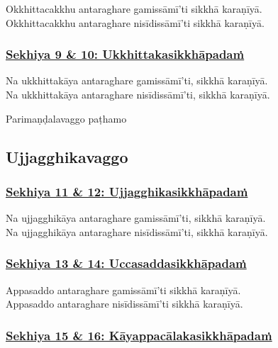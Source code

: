 Okkhittacakkhu antaraghare gamissāmī'ti sikkhā karaṇīyā.\\
Okkhittacakkhu antaraghare nisīdissāmī'ti sikkhā karaṇīyā.



\subsubsection*{\hyperref[training9-10]{Sekhiya 9 \& 10: Ukkhittakasikkhāpadaṁ}}
\label{sekh9-10}

Na ukkhittakāya antaraghare gamissāmī'ti, sikkhā karaṇīyā.\\
Na ukkhittakāya antaraghare nisīdissāmī'ti, sikkhā karaṇīyā.

\begin{center}
	Parimaṇḍalavaggo paṭhamo
\end{center}



\subsection{Ujjagghikavaggo}

\subsubsection*{\hyperref[training11-12]{Sekhiya 11 \& 12: Ujjagghikasikkhāpadaṁ}}
\label{sekh11-12}

Na ujjagghikāya antaraghare gamissāmī'ti, sikkhā karaṇīyā.\\
Na ujjagghikāya antaraghare nisīdissāmī'ti, sikkhā karaṇīyā.



\subsubsection*{\hyperref[training13-14]{Sekhiya 13 \& 14: Uccasaddasikkhāpadaṁ}}
\label{sekh13-14}

Appasaddo antaraghare gamissāmī'ti sikkhā karaṇīyā.\\
Appasaddo antaraghare nisīdissāmī'ti sikkhā karaṇīyā.



\subsubsection*{\hyperref[training15-16]{Sekhiya 15 \& 16: Kāyappacālakasikkhāpadaṁ}}
\label{sekh15-16}

